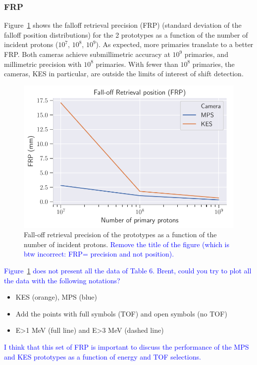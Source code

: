 \documentclass[a4paper,english,12pt]{article}
\newcommand{\et}[2][blue]{\textcolor{#1}{#2}}
\begin{document}
\subsubsection{FRP}

Figure~\ref{fig:PCFRPComp} shows the falloff retrieval precision (FRP) (standard deviation of the falloff position distributions) for the 2 prototypes as a function of the number of incident protons ($10^7$, $10^8$, $10^9$). As expected, more primaries translate to a better FRP. Both cameras achieve submillimetric accuracy at $10^9$ primaries, and millimetric precision with $10^8$ primaries. With fewer than $10^8$ primaries, the cameras, KES in particular, are outside the limits of interest of shift detection.

\begin{figure}[!htp]
  \centering
  \includegraphics[width=.8\textwidth]{pc_frp_plot}
	\caption{\label{fig:PCFRPComp}Fall-off retrieval precision of the prototypes as a function of the number of incident protons. \et{Remove the title of the figure (which is btw incorrect: FRP= precision and not position).}}
\end{figure}

\et{Figure~\ref{fig:PCFRPComp} does not present all the data of Table 6. Brent, could you try to plot all the data with the following notations?}
	\begin{itemize}
		\item KES (orange), MPS (blue)
		\item Add the points with full symbols (TOF) and open symbols (no TOF)
		\item E>1 MeV (full line) and E>3 MeV (dashed line)
	\end{itemize}
	\et{I think that this set of FRP is important to discuss the performance of the MPS and KES prototypes as a function of energy and TOF selections.}
\end{document}
